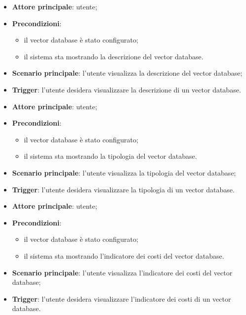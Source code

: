 \documentclass[10pt, a4paper]{article}
\begin{document}
    \begin{itemize}
        \item \textbf{Attore principale}: utente;
        \item \textbf{Precondizioni}:
        \begin{itemize}
            \item il vector database è stato configurato;
            \item il sistema sta mostrando la descrizione del vector database.
        \end{itemize}
        \item \textbf{Scenario principale}: l'utente visualizza la descrizione del vector database;
        \item \textbf{Trigger}: l’utente desidera visualizzare la descrizione di un vector database.
    \end{itemize}

    \begin{itemize}
        \item \textbf{Attore principale}: utente;
        \item \textbf{Precondizioni}:
        \begin{itemize}
            \item il vector database è stato configurato;
            \item il sistema sta mostrando la tipologia del vector database.
        \end{itemize}
        \item \textbf{Scenario principale}: l'utente visualizza la tipologia del vector database;
        \item \textbf{Trigger}: l’utente desidera visualizzare la tipologia di un vector database.
    \end{itemize}

    \begin{itemize}
        \item \textbf{Attore principale}: utente;
        \item \textbf{Precondizioni}:
        \begin{itemize}
            \item il vector database è stato configurato;
            \item il sistema sta mostrando l'indicatore dei costi del vector database.
        \end{itemize}
        \item \textbf{Scenario principale}: l'utente visualizza l'indicatore dei costi del vector database;
        \item \textbf{Trigger}: l’utente desidera visualizzare l'indicatore dei costi di un vector database.
    \end{itemize}
\end{document}
